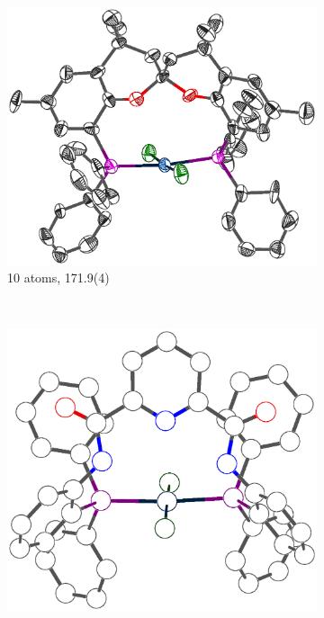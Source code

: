 \begin{figure}[htbp]
        \centering
        \begin{subfigure}[b]{0.4\textwidth}
                \includegraphics[width=\textwidth]{../Othercrystals/PtCl2/Trans/196130.eps}
                \caption{10 atoms, 171.9(4)\degrees{}\cite{Freixa2003b}}
                \label{WABXIH}
        \end{subfigure}%
        ~ 
        \begin{subfigure}[b]{0.3\textwidth}
                \includegraphics[width=\textwidth]{../Othercrystals/PtCl2/Trans/NURGAI.eps}

\end{subfigure}
\end{figure}
